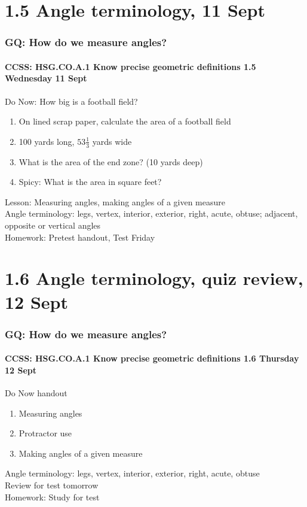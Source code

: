 \documentclass{beamer}
\begin{document}
\section{1.5 Angle terminology, 11 Sept}
  \frame
  {
    \frametitle{GQ: How do we measure angles?}
    \framesubtitle{CCSS: HSG.CO.A.1 Know precise geometric definitions \hfill \alert{1.5 Wednesday 11 Sept}}
 
    \begin{block}{Do Now: How big is a football field?}
      \begin{enumerate}
          \item On lined scrap paper, calculate the area of a football field
          \item 100 yards long, $53 \frac{1}{3}$ yards wide
          \item What is the area of the end zone? (10 yards deep)
          \item Spicy: What is the area in square feet?
      \end{enumerate}
      \end{block}
    Lesson: Measuring angles, making angles of a given measure\\
    Angle terminology: legs, vertex, interior, exterior, right, acute, obtuse; adjacent, opposite or vertical angles\\ \vspace{0.5cm}
    Homework: Pretest handout, \alert{Test Friday}
  }
    
\section{1.6 Angle terminology, quiz review, 12 Sept}
\frame
{
  \frametitle{GQ: How do we measure angles?}
  \framesubtitle{CCSS: HSG.CO.A.1 Know precise geometric definitions \hfill \alert{1.6 Thursday 12 Sept}}
  \begin{block}{Do Now handout}
  \begin{enumerate}
      \item Measuring angles
      \item Protractor use
      \item Making angles of a given measure
  \end{enumerate}
  \end{block}
  Angle terminology: legs, vertex, interior, exterior, right, acute, obtuse\\
  Review for \alert{test tomorrow} \\
  Homework: Study for test
}
\end{document}

